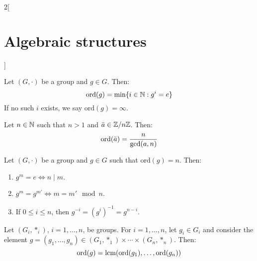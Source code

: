 \documentclass[../../../main.tex]{subfiles}
\begin{document}
\begin{multicols}{2}[\section{Algebraic structures}]
\begin{definition}
    \end{definition}
    \begin{prop}
        Let $(G,\cdot)$ be a group and $g\in G$. Then: $$\text{ord}(g)=\min\{i\in\mathbb{N} :g^i=e\}$$
        If no such $i$ exists, we say $\text{ord}(g)=\infty$.
    \end{prop}
    \begin{corollary}
        Let $n\in\mathbb{N} $ such that $n>1$ and $\Bar{a}\in\mathbb{Z} /n\mathbb{Z} $. Then: $$\text{ord}(\Bar{a})=\frac{n}{\gcd(a,n)}$$
    \end{corollary}
    \begin{lemma}
        Let $(G,\cdot)$ be a group and $g\in G$ such that $\text{ord}(g)=n$. Then:
        \begin{enumerate}
            \item $g^m=e\iff n\mid m$.
            \item $g^m=g^{m'}\iff m=m'\mod{n}$.
            \item If $0\leq i\leq n$, then $g^{-i}=(g^i)^{-1}=g^{n-i}$.
        \end{enumerate}
    \end{lemma}
    \begin{corollary}
        Let $(G_i,*_i)$, $i=1,\ldots, n$, be groups. For $i=1,\ldots,n$, let $g_i\in G_i$ and consider the element $g=(g_1,\ldots,g_n)\in(G_1,*_1)\times\cdots\times(G_n,*_n)$. Then: $$\text{ord}(g)=\operatorname{lcm}(\text{ord}(g_1),\ldots,\text{ord}(g_n))$$
    \end{corollary}

\end{multicols}
\end{document}
